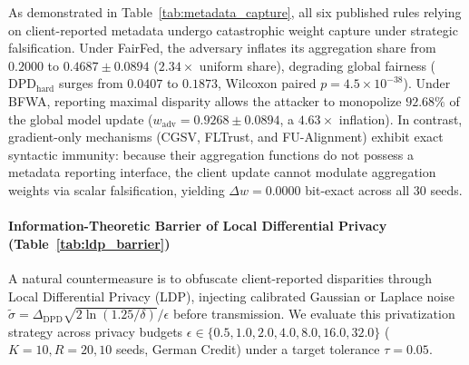 As demonstrated in Table~\ref{tab:metadata_capture}, all six published rules relying on client-reported metadata undergo catastrophic weight capture under strategic falsification. Under FairFed, the adversary inflates its aggregation share from $0.2000$ to $0.4687 \pm 0.0894$ ($2.34\times$ uniform share), degrading global fairness ($\text{DPD}_{\text{hard}}$ surges from $0.0407$ to $0.1873$, Wilcoxon paired $p = 4.5 \times 10^{-38}$). Under BFWA, reporting maximal disparity allows the attacker to monopolize $92.68\%$ of the global model update ($w_{\mathrm{adv}} = 0.9268 \pm 0.0894$, a $4.63\times$ inflation). In contrast, gradient-only mechanisms (CGSV, FLTrust, and FU-Alignment) exhibit exact syntactic immunity: because their aggregation functions do not possess a metadata reporting interface, the client update cannot modulate aggregation weights via scalar falsification, yielding $\Delta w = 0.0000$ bit-exact across all 30 seeds.



\paragraph{Information-Theoretic Barrier of Local Differential Privacy (Table~\ref{tab:ldp_barrier})}
A natural countermeasure is to obfuscate client-reported disparities through Local Differential Privacy (LDP), injecting calibrated Gaussian or Laplace noise $\tilde{\sigma} = \Delta_{\text{DPD}} \sqrt{2 \ln(1.25/\delta)} / \epsilon$ before transmission. We evaluate this privatization strategy across privacy budgets $\epsilon \in \{0.5, 1.0, 2.0, 4.0, 8.0, 16.0, 32.0\}$ ($K=10, R=20, 10$ seeds, German Credit) under a target tolerance $\tau = 0.05$.

